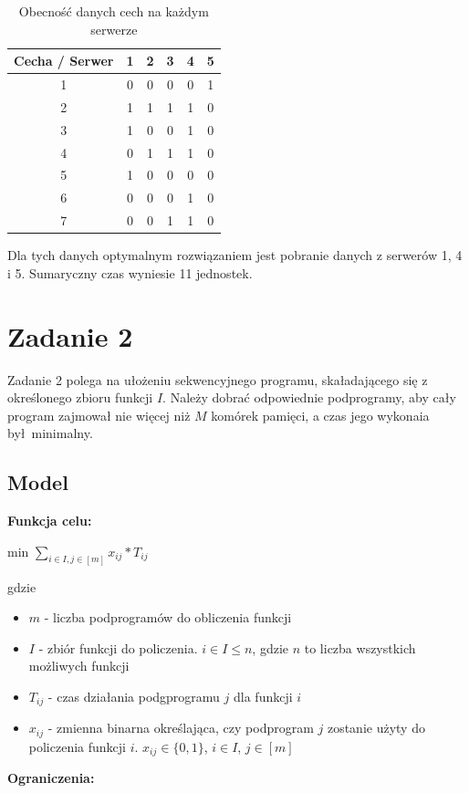 \documentclass[12pt, a4paper]{article}
\begin{document}
\begin{table}[H]
\begin{center}
\begin{tabular}{|c|c|c|c|c|c|}
  \hline
  Cecha / Serwer & 1 & 2 & 3 & 4 & 5 \\
  \hline
  1 & 0 & 0 & 0 & 0 & 1 \\
  \hline
  2 & 1 & 1 & 1 & 1 & 0 \\
  \hline
  3 & 1 & 0 & 0 & 1 & 0 \\
  \hline
  4 & 0 & 1 & 1 & 1 & 0 \\
  \hline
  5 & 1 & 0 & 0 & 0 & 0 \\
  \hline
  6 & 0 & 0 & 0 & 1 & 0 \\
  \hline
  7 & 0 & 0 & 1 & 1 & 0 \\
  \hline
\end{tabular}
\caption{Obecność danych cech na każdym serwerze}
\end{center}
\end{table}

Dla tych danych optymalnym rozwiązaniem jest pobranie danych z serwerów 1, 4 i 5. Sumaryczny czas wyniesie 11 jednostek.

 
\section{Zadanie 2}

Zadanie 2 polega na ułożeniu sekwencyjnego programu, skaładającego się z określonego zbioru funkcji $I$. Należy
dobrać odpowiednie podprogramy, aby cały program zajmował nie więcej niż $M$ komórek pamięci, a czas jego wykonaia był minimalny.


\subsection{Model}

\textbf{Funkcja celu:}

\begin{center}
	min \textbf{$\displaystyle\sum_{i \in I, j \in [m]} x_{ij} * T_{ij}$}
\end{center}
gdzie

\begin{itemize}
    \item $m$ - liczba podprogramów do obliczenia funkcji
    \item $I$ - zbiór funkcji do policzenia. $i \in I \leq n$, gdzie $n$ to liczba wszystkich możliwych funkcji
    \item $T_{ij}$ - czas działania podgprogramu $j$ dla funkcji $i$
    \item $x_{ij}$ - zmienna binarna określająca, czy podprogram $j$ zostanie użyty do policzenia funkcji $i$. $x_{ij} \in \{0, 1\}$, $i \in I$, $j \in [m]$
\end{itemize}
\textbf{Ograniczenia:}
\end{document}

